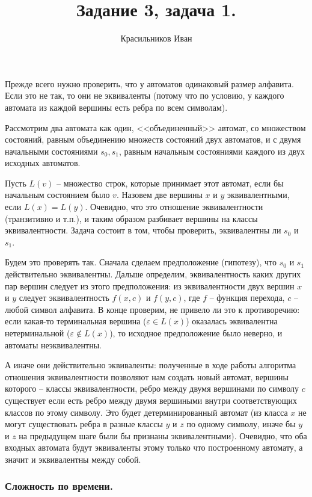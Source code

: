 \documentclass[a4paper, 12pt, onepage]{article}
\begin{document}
\author{Красильников Иван}
\title{Задание 3, задача 1.}
\maketitle

Прежде всего нужно проверить, что у автоматов одинаковый размер алфавита. Если это не так, то они не эквиваленты
(потому что по условию, у каждого автомата из каждой вершины есть ребра по всем символам).

Рассмотрим два автомата как один, <<объединенный>> автомат, со множеством состояний, равным объединению множеств
состояний двух автоматов, и с двумя начальными состояниями $s_0, s_1$, равным начальным состояниями каждого из двух
исходных автоматов.

Пусть $L(v)$ -- множество строк, которые принимает этот автомат, если бы начальным состоянием было $v$.
Назовем две вершины $x$ и $y$ эквивалентными, если $L(x) = L(y)$. Очевидно, что это отношение
эквивалентности (транзитивно и т.п.), и таким образом разбивает вершины на классы эквивалентности.
Задача состоит в том, чтобы проверить, эквивалентны ли $s_0$ и $s_1$.

Будем это проверять так. Сначала сделаем предположение (гипотезу), что $s_0$ и $s_1$ действительно эквивалентны.
Дальше определим, эквивалентность каких других пар вершин следует из этого предположения:
из эквивалентности двух вершин $x$ и $y$ следует эквивалентность $f(x, c)$ и $f(y, c)$,
где $f$ -- функция перехода, $c$ -- любой символ алфавита. В конце проверим,
не привело ли это к противоречию: если какая-то терминальная вершина ($\varepsilon \in L(x)$)
оказалась эквивалентна нетерминальной ($\varepsilon \not\in L(x)$), то исходное предположение было неверно,
и автоматы неэквивалентны.

А иначе они действительно эквиваленты: полученные в ходе работы алгоритма отношения эквивалентности
позволяют нам создать новый автомат, вершины которого -- классы эквивалентности, ребро между двумя вершинами по 
символу $c$ существует если есть ребро между двумя вершиными внутри соответствующих классов по этому символу.
Это будет детерминированный автомат (из класса $x$ не могут существовать ребра в разные классы $y$ и $z$ по
одному символу, иначе бы $y$ и $z$ на предыдущем шаге были бы признаны эквивалентными). Очевидно, что оба
входных автомата будут эквиваленты этому только что построенному автомату, а значит и эквивалентны между собой.

\subsubsection*{Сложность по времени.}
\end{document}
